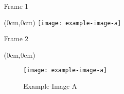 \documentclass{beamer}
\begin{document}
\begin{frame}{Frame 1}
\begin{textblock*}{.5\paperwidth}(0cm,0cm)
    \texttt{[image: example-image-a]}
\end{textblock*}
\end{frame}

\begin{frame}{Frame 2}
\begin{textblock*}{\paperwidth}(0cm,0cm)
\begin{figure}
\texttt{[image: example-image-a]}
\caption{Example-Image A}
\end{figure}
\end{textblock*}
\end{frame}
\end{document}
